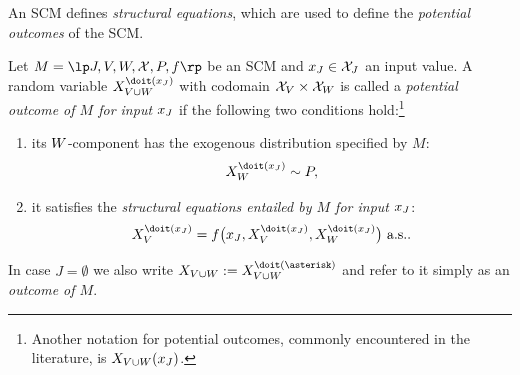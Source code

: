 An SCM defines \emph{structural equations}, which are used to define the \emph{potential outcomes} of the SCM.
\begin{Def}\label{def:scm_solutions_for_inputs}
  Let $M = \lt \Sin, \Send, \Srnd, \CX, P, f \rt$ be an SCM
  and $x_{J} \in \mathcal{X}_{J}$ an input value.
  A random variable $X_{V \cup W}^{\doit(\xJ)}$ with codomain $\mathcal{X}_{V} \times \mathcal{X}_{W}$ is called
  a \emph{potential outcome of $M$ for input $x_{J}$} 
  if the following two conditions hold:\footnote{Another notation for potential outcomes, commonly encountered in the literature, is $X_{V\cup W}(x_{J})$.}
    \begin{enumerate}
      \item its $W$-component has the exogenous distribution specified by $M$: 
        $$\XW^{\doit(\xJ)} \sim P,$$
      \item it satisfies the \emph{structural equations entailed by $M$ for input $x_{J}$}:
        \begin{equation}\label{eq:cscm_structural_equations}
          \XV^{\doit(\xJ)} = f\big(\xJ, \XV^{\doit(\xJ)}, \XW^{\doit(\xJ)}\big) \text{ a.s.}.
        \end{equation}
    \end{enumerate}
  In case $J = \emptyset$ we also write $X_{V \cup W} := X_{V \cup W}^{\doit(\asterisk)}$ and refer to it simply as an \emph{outcome of $M$}.
\end{Def}

